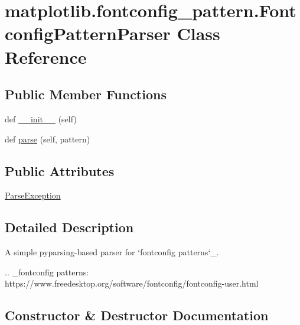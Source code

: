 \hypertarget{classmatplotlib_1_1fontconfig__pattern_1_1FontconfigPatternParser}{}\section{matplotlib.\+fontconfig\+\_\+pattern.\+Fontconfig\+Pattern\+Parser Class Reference}
\label{classmatplotlib_1_1fontconfig__pattern_1_1FontconfigPatternParser}
\subsection*{Public Member Functions}
\begin{DoxyCompactItemize}
\item 
def \hyperlink{classmatplotlib_1_1fontconfig__pattern_1_1FontconfigPatternParser_a55a18e423ffabd23144472dbb6b33e1d}{\+\_\+\+\_\+init\+\_\+\+\_\+} (self)
\item 
def \hyperlink{classmatplotlib_1_1fontconfig__pattern_1_1FontconfigPatternParser_a3875ffebaedb9aa4a3e0e4e6ab74a897}{parse} (self, pattern)
\end{DoxyCompactItemize}
\subsection*{Public Attributes}
\begin{DoxyCompactItemize}
\item 
\hyperlink{classmatplotlib_1_1fontconfig__pattern_1_1FontconfigPatternParser_a426d954ecc22f647c9bb27f038275831}{Parse\+Exception}
\end{DoxyCompactItemize}


\subsection{Detailed Description}
\begin{DoxyVerb}A simple pyparsing-based parser for `fontconfig patterns`_.

.. _fontconfig patterns:
   https://www.freedesktop.org/software/fontconfig/fontconfig-user.html
\end{DoxyVerb}
 

\subsection{Constructor \& Destructor Documentation}
\mbox{\label{classmatplotlib_1_1fontconfig__pattern_1_1FontconfigPatternParser_a55a18e423ffabd23144472dbb6b33e1d}} 
